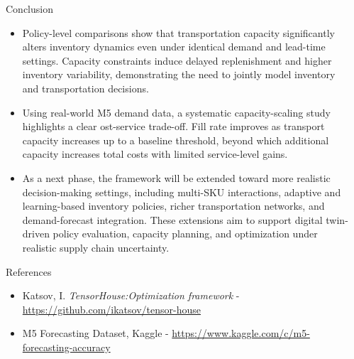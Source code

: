 \documentclass[final]{beamer}
\newlength{\sepwidth}
\newlength{\colwidth}
\newcommand{\separatorcolumn}{\begin{column}{\sepwidth}\end{column}}
\begin{document}
\begin{frame}[t]
\begin{columns}[t]
\begin{column}{\colwidth}
\begin{block}{Conclusion}
\begin{itemize}
				\item Policy-level comparisons show that transportation capacity significantly alters inventory dynamics 
				even under identical demand and lead-time settings. Capacity constraints induce delayed replenishment and
				higher inventory variability, demonstrating the need to jointly model inventory and transportation decisions.

				\item Using real-world M5 demand data, a systematic capacity-scaling study highlights a clear 
				ost-service trade-off. Fill rate improves as transport capacity increases up to a baseline threshold, 
				beyond which additional capacity increases total costs with limited service-level gains.

				\item As a next phase, the framework will be extended toward more realistic decision-making settings, 
				including multi-SKU interactions, adaptive and learning-based inventory policies, richer transportation 
				networks, and demand-forecast integration. These extensions aim to support digital twin-driven policy 
				evaluation, capacity planning, and optimization under realistic supply chain uncertainty.
				\end{itemize}

				
				
			\end{block}
			
			
			\begin{block}{References}
				\begin{itemize}
				\item Katsov, I. \emph{TensorHouse:Optimization framework} - \mbox{\href{https://github.com/ikatsov/tensor-house}{https://github.com/ikatsov/tensor-house}}
				\item M5 Forecasting Dataset, Kaggle - \mbox{\href{https://www.kaggle.com/c/m5-forecasting-accuracy}{https://www.kaggle.com/c/m5-forecasting-accuracy}}
				\end{itemize}

			\end{block}
		\end{column}
		
		\separatorcolumn
	\end{columns}
\end{frame}
\end{document}

